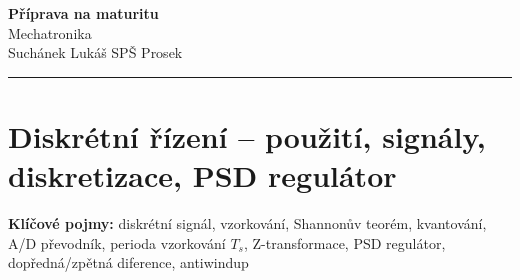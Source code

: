 \documentclass[a4paper,10pt]{article}
\begin{document}
\begin{minipage}[t]{0.75\textwidth}
    {\Huge\bfseries\color{accent} Příprava na maturitu}\\[4pt]
    {\large\color{stripeblue} Mechatronika}\\[2pt]
    \textcolor{medgray}{\small Suchánek Lukáš \quad SPŠ Prosek }
\end{minipage}
\hfill
\begin{minipage}[t]{0.22\textwidth}
    \raggedleft
\end{minipage}

\vspace{6pt}
\noindent\color{accent}\rule{\linewidth}{1.5pt}
\vspace{2pt}

\section{Diskrétní řízení -- použití, signály, diskretizace, PSD regulátor}

\begin{pojmybox}
\textbf{Klíčové pojmy:}
diskrétní signál, vzorkování, Shannonův teorém, kvantování,
A/D převodník, perioda vzorkování $T_s$, Z-transformace,
PSD regulátor, dopředná/zpětná diference, antiwindup
\end{pojmybox}
\end{document}

